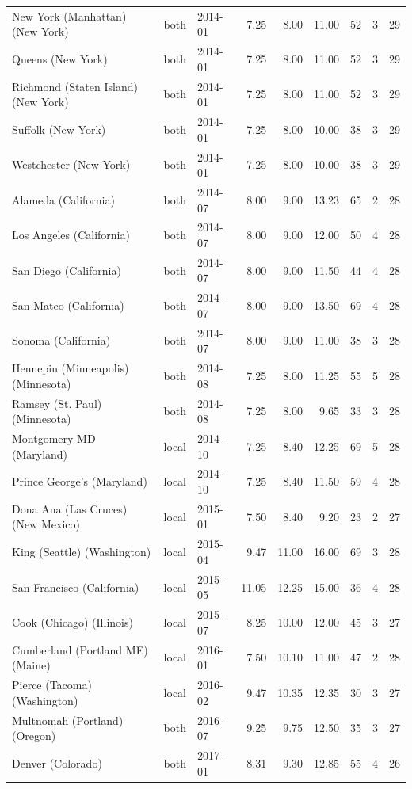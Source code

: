 \begin{tabular}{lllrrrrrr}
New York (Manhattan) (New York) & both & 2014-01 & 7.25 & 8.00 & 11.00 & 52 & 3 & 29 \\
Queens (New York) & both & 2014-01 & 7.25 & 8.00 & 11.00 & 52 & 3 & 29 \\
Richmond (Staten Island) (New York) & both & 2014-01 & 7.25 & 8.00 & 11.00 & 52 & 3 & 29 \\
Suffolk (New York) & both & 2014-01 & 7.25 & 8.00 & 10.00 & 38 & 3 & 29 \\
Westchester (New York) & both & 2014-01 & 7.25 & 8.00 & 10.00 & 38 & 3 & 29 \\
Alameda (California) & both & 2014-07 & 8.00 & 9.00 & 13.23 & 65 & 2 & 28 \\
Los Angeles (California) & both & 2014-07 & 8.00 & 9.00 & 12.00 & 50 & 4 & 28 \\
San Diego (California) & both & 2014-07 & 8.00 & 9.00 & 11.50 & 44 & 4 & 28 \\
San Mateo (California) & both & 2014-07 & 8.00 & 9.00 & 13.50 & 69 & 4 & 28 \\
Sonoma (California) & both & 2014-07 & 8.00 & 9.00 & 11.00 & 38 & 3 & 28 \\
Hennepin (Minneapolis) (Minnesota) & both & 2014-08 & 7.25 & 8.00 & 11.25 & 55 & 5 & 28 \\
Ramsey (St. Paul) (Minnesota) & both & 2014-08 & 7.25 & 8.00 & 9.65 & 33 & 3 & 28 \\
Montgomery MD (Maryland) & local & 2014-10 & 7.25 & 8.40 & 12.25 & 69 & 5 & 28 \\
Prince George's (Maryland) & local & 2014-10 & 7.25 & 8.40 & 11.50 & 59 & 4 & 28 \\
Dona Ana (Las Cruces) (New Mexico) & local & 2015-01 & 7.50 & 8.40 & 9.20 & 23 & 2 & 27 \\
King (Seattle) (Washington) & local & 2015-04 & 9.47 & 11.00 & 16.00 & 69 & 3 & 28 \\
San Francisco (California) & local & 2015-05 & 11.05 & 12.25 & 15.00 & 36 & 4 & 28 \\
Cook (Chicago) (Illinois) & local & 2015-07 & 8.25 & 10.00 & 12.00 & 45 & 3 & 27 \\
Cumberland (Portland ME) (Maine) & local & 2016-01 & 7.50 & 10.10 & 11.00 & 47 & 2 & 28 \\
Pierce (Tacoma) (Washington) & local & 2016-02 & 9.47 & 10.35 & 12.35 & 30 & 3 & 27 \\
Multnomah (Portland) (Oregon) & both & 2016-07 & 9.25 & 9.75 & 12.50 & 35 & 3 & 27 \\
Denver (Colorado) & both & 2017-01 & 8.31 & 9.30 & 12.85 & 55 & 4 & 26 \\

\end{tabular}
